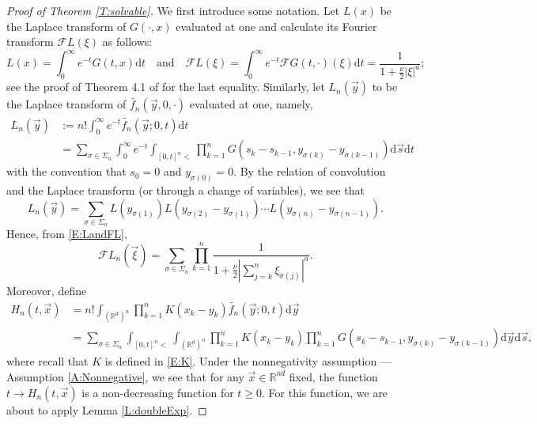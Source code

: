 \documentclass[12pt]{report}
\theoremstyle{plain}
\theoremstyle{definition}
\numberwithin{equation}{section}
\newcommand{\R}{\mathbb{R}}
\newcommand{\ud}{\ensuremath{ \mathrm{d} }}
\begin{document}
\begin{proof}[Proof of Theorem \ref{T:solvable}]
	We first introduce some notation. Let $L(x)$ be the Laplace transform of $G(\cdot,x)$ evaluated at
	one and calculate its Fourier transform $\mathcal{F}L(\xi)$ as follows:
	\begin{equation}
	\label{E:LandFL}
	L(x)              = \int_0^\infty e^{-t}G(t,x) \ud t \quad \text{and} \quad
	\mathcal{F}L(\xi) = \int_0^\infty e^{-t}\mathcal{F}G(t,\cdot)(\xi) \ud t
	= \dfrac{1}{1 + \frac{\nu}{2}|\xi|^a};
	\end{equation}
	see the proof of Theorem 4.1 of \cite{chen.hu.ea:19:nonlinear} for the last equality.  Similarly, let $L_n(\vec{y})$
	to be the Laplace transform of $\widetilde{f_n}(\vec{y},0,\cdot)$ evaluated at one, namely,
	\begin{align*}
	L_n(\vec{y}) & := n! \int_0^\infty e^{-t}\widetilde{f_n}(\vec{y};0,t) \ud t \\
	& = \sum_{\sigma \in \Sigma_n} \int_0^\infty e^{-t} \int_{[0,t]^n<} \prod_{k=1}^n G(s_k - s_{k-1}, y_{\sigma(k)}-y_{\sigma(k-1)}) \ud \vec{s} \ud t
	\end{align*}
	with the convention that $s_0 = 0$ and $y_{\sigma(0)} = 0$.  By the relation of convolution and
	the Laplace transform (or through a change of variables), we see that
	\begin{equation}
	L_n(\vec{y}) = \sum_{\sigma \in \Sigma_n} L\left(y_{\sigma(1)}\right) L\left(y_{\sigma(2)}-y_{\sigma(1)}\right) \cdots L\left(y_{\sigma(n)}-y_{\sigma(n-1)}\right).
	\end{equation}
	Hence, from \eqref{E:LandFL},
	\begin{equation} \label{E:FLfn}
	\mathcal{F}L_n(\vec{\xi}) = \sum_{\sigma \in \Sigma_n} \prod_{k=1}^{n} \dfrac{1}{1+ \frac{\nu}{2}\left|\sum_{j=k}^n \xi_{\sigma(j)} \right|^a}.
	\end{equation}
	Moreover, define
	\begin{align}
	H_n(t, \vec{x})
	& = n! \int_{(\R^d)^n} \prod_{k=1}^n K(x_k - y_k) \widetilde{f_n}(\vec{y};0,t) \ud \vec{y} \nonumber \\
	& = \sum_{\sigma \in \Sigma_n} \int_{[0,t]^n <} \int_{(\R^d)^n} \prod_{k=1}^n K(x_k-y_k)   \prod_{k=1}^n G(s_k - s_{k-1}, y_{\sigma(k)} - y_{\sigma(k-1)}) \ud \vec{y} \ud \vec{s},
	\label{E:H}
	\end{align}
	where recall that $K$ is defined in \eqref{E:K}. Under the nonnegativity assumption --- Assumption
	\ref{A:Nonnegative}, we see that for any $\vec{x} \in\R^{nd}$ fixed, the function $t\to
	H_n\left(t,\vec{x} \right)$ is a non-decreasing function for $t\ge 0$. For this function, we are
	about to apply Lemma \ref{L:doubleExp}.
	

\end{proof}
\end{document}
